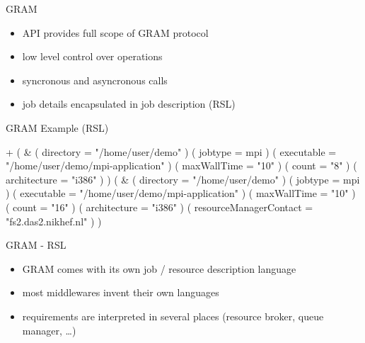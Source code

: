 \documentclass[%
  pdf,
  colorBG,
  slideColor,
  frames,
  ogf
]{prosper}
\newcommand{\dn}{\vspace*{+1em}}
\begin{document}

 \begin{slide}{GRAM}

  \dn 

  \begin{itemize}
   \item API provides full scope of GRAM protocol
   \item low level control over operations
   \item syncronous and asyncronous calls
   \item job details encapsulated in job description (RSL)
  \end{itemize}

 \end{slide}


 \begin{slide}{GRAM Example (RSL)}

  \begin{mycode}[label=GRAM: RSL example]
  + ( &
      ( directory    = "/home/user/demo" )
      ( jobtype      =  mpi )
      ( executable   = "/home/user/demo/mpi-application" )
      ( maxWallTime  = "10" )
      ( count        = "8" )
      ( architecture = "i386" )
    ) 
    ( &
      ( directory    = "/home/user/demo" )
      ( jobtype      =  mpi )
      ( executable   = "/home/user/demo/mpi-application" )
      ( maxWallTime  = "10" )
      ( count        = "16" )
      ( architecture = "i386" )
      ( resourceManagerContact = "fs2.das2.nikhef.nl" )
  )
  \end{mycode}

 \end{slide}


 \begin{slide}{GRAM - RSL}

  \dn 

  \begin{itemize}
   \item GRAM comes with its own job / resource description language
   \item most middlewares invent their own languages
   \item requirements are interpreted in several places (resource broker,
   queue manager, \dots)
  \end{itemize}

 \end{slide}
\end{document}
